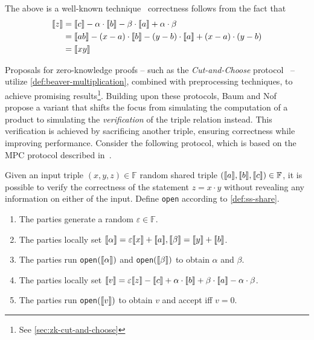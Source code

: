 \documentclass[11pt]{report}
\theoremstyle{definition}
\theoremstyle{plain}
\begin{document}
The above is a well-known technique~\cite{beaver1992efficient} correctness follows from the fact that
\begin{align*}
  \llbracket z \rrbracket & = \llbracket c \rrbracket - \alpha \cdot \llbracket b \rrbracket - \beta \cdot \llbracket a \rrbracket + \alpha \cdot \beta        \\
         & = \llbracket ab \rrbracket - (x - a) \cdot \llbracket b \rrbracket - (y - b) \cdot \llbracket a \rrbracket + (x - a) \cdot (y - b) \\
         & = \llbracket xy \rrbracket
\end{align*}

Proposals for zero-knowledge proofs -- such as the \textit{Cut-and-Choose} protocol~\cite{katz2018improved,baum2020concretely} -- utilize \autoref{def:beaver-multiplication}, combined with preprocessing techniques, to achieve promising results\footnote{See \autoref{sec:zk-cut-and-choose}}. Building upon these protocols, Baum and Nof~\cite{baum2020concretely} propose a variant that shifts the focus from simulating the computation of a product to simulating the \textit{verification} of the triple relation instead. This verification is achieved by sacrificing another triple, ensuring correctness while improving performance. Consider the following protocol, which is based on the MPC protocol described in~\cite{damgaard2012multiparty}.

\begin{protocol}\label{def:sacrifice}
  Given an input triple $(x,y,z) \in \mathbb{F}$ random shared triple $(\llbracket a \rrbracket, \llbracket b \rrbracket, \llbracket c \rrbracket) \in \mathbb{F}$, it is possible to verify the correctness of the statement $z = x \cdot y$ without revealing any information on either of the input. Define \texttt{open} according to \autoref{def:ss-share}.
  \begin{enumerate}
    \item The parties generate a random $\varepsilon \in \mathbb{F}$.
    \item The parties locally set $\llbracket \alpha \rrbracket = \varepsilon\llbracket x \rrbracket + \llbracket a \rrbracket, \llbracket \beta \rrbracket = \llbracket y \rrbracket + \llbracket b \rrbracket$.
    \item The parties run \texttt{open}$(\llbracket \alpha \rrbracket)$ and \texttt{open}$(\llbracket \beta \rrbracket)$ to obtain $\alpha$ and $\beta$.
    \item The parties locally set $\llbracket v \rrbracket = \varepsilon\llbracket z \rrbracket - \llbracket c \rrbracket + \alpha  \cdot \llbracket b \rrbracket + \beta  \cdot \llbracket a \rrbracket - \alpha  \cdot \beta$.
    \item The parties run \texttt{open}$(\llbracket v \rrbracket)$ to obtain $v$ and accept iff $v = 0$.
  \end{enumerate}
\end{protocol}
\end{document}
